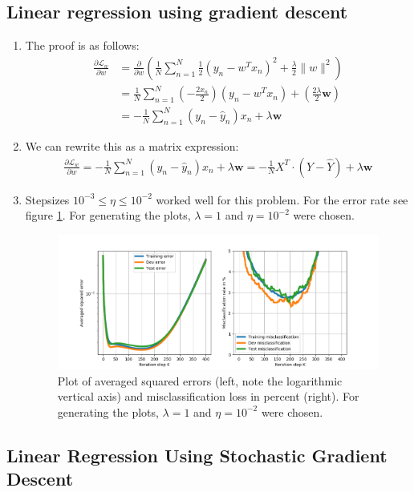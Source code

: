 \documentclass[12pt]{article}
\begin{document}
\subsection{Linear regression using gradient descent}

\begin{enumerate}
	\item The proof is as follows:
		\begin{align*}
			\frac{\partial \mathcal{L}_w}{\partial w} &= \frac{\partial}{\partial w} \left( \frac{1}{N} \sum_{n=1}^{N} \frac{1}{2} \left( y_n - w^Tx_n \right)^2 + \frac{\lambda}{2} \lVert w \rVert^2 \right) \\
			&= \frac{1}{N} \sum_{n=1}^{N} \left( -\frac{2x_n}{2} \right) \left( y_n - w^Tx_n \right) + \left( \frac{2\lambda}{2} \textbf{w}  \right) \\
			&= -\frac{1}{N} \sum_{n=1}^{N} \left( y_n - \hat{y}_n \right) x_n + \lambda \textbf{w}
		\end{align*}
	\item We can rewrite this as a matrix expression:
		\begin{align*}
			\frac{\partial \mathcal{L}_w}{\partial w} = -\frac{1}{N} \sum_{n=1}^{N} \left( y_n - \hat{y}_n \right) x_n + \lambda \textbf{w} = - \frac{1}{N} X^T \cdot \left( Y - \hat{Y} \right) + \lambda \textbf{w}
		\end{align*}
	\item Stepsizes $ 10^{-3} \leq \eta \leq 10^{-2} $ worked well for this problem. For the error rate see figure \ref{fig:1.2}. For generating the plots, $\lambda=1$ and $\eta=10^{-2}$ were chosen.
		\begin{figure}[h!]
			\centering
			\includegraphics[width=\linewidth]{./Problem_1/Problem_1.2_10-2.png}
			\caption{Plot of averaged squared errors (left, note the logarithmic vertical axis) and misclassification loss in percent (right). For generating the plots, $\lambda=1$ and $\eta=10^{-2}$ were chosen.}
			\label{fig:1.2}
		\end{figure}
\end{enumerate}

\subsection{Linear Regression Using Stochastic Gradient Descent}


\newpage


%	



\end{document}
